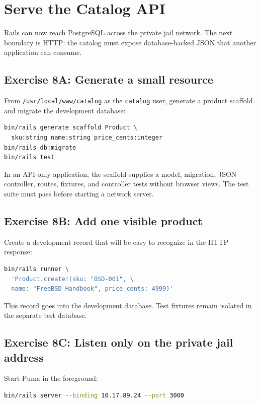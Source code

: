 \chapter{Serve the Catalog API}

Rails can now reach PostgreSQL across the private jail network. The next
boundary is HTTP: the catalog must expose database-backed JSON that another
application can consume.

\section{Exercise 8A: Generate a small resource}

From \texttt{/usr/local/www/catalog} as the \texttt{catalog} user, generate a
product scaffold and migrate the development database:

\begin{lstlisting}[language=sh]
bin/rails generate scaffold Product \
  sku:string name:string price_cents:integer
bin/rails db:migrate
bin/rails test
\end{lstlisting}

In an API-only application, the scaffold supplies a model, migration, JSON
controller, routes, fixtures, and controller tests without browser views. The
test suite must pass before starting a network server.

\section{Exercise 8B: Add one visible product}

Create a development record that will be easy to recognize in the HTTP
response:

\begin{lstlisting}[language=sh]
bin/rails runner \
  'Product.create!(sku: "BSD-001", \
  name: "FreeBSD Handbook", price_cents: 4999)'
\end{lstlisting}

This record goes into the development database. Test fixtures remain isolated
in the separate test database.

\section{Exercise 8C: Listen only on the private jail address}

Start Puma in the foreground:

\begin{lstlisting}[language=sh]
bin/rails server --binding 10.17.89.24 --port 3000
\end{lstlisting}

